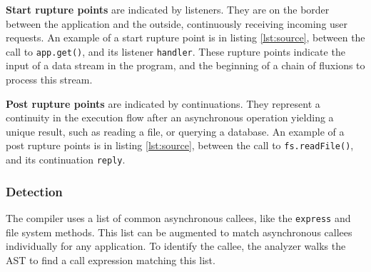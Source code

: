 \textbf{Start rupture points} are indicated by listeners. They are on the border between the application and the outside, continuously receiving incoming user requests.
An example of a start rupture point is in listing \ref{lst:source}, between the call to \texttt{app.get()}, and its listener \texttt{handler}.
These rupture points indicate the input of a data stream in the program, and the beginning of a chain of fluxions to process this stream.

\textbf{Post rupture points} are indicated by continuations.
They represent a continuity in the execution flow after an asynchronous operation yielding a unique result, such as reading a file, or querying a database.
An example of a post rupture points is in listing \ref{lst:source}, between the call to \texttt{fs.readFile()}, and its continuation \texttt{reply}.


\subsubsection{Detection}

The compiler uses a list of common asynchronous callees, like the \texttt{express} and file system methods.
This list can be augmented to match asynchronous callees individually for any application.
To identify the callee, the analyzer walks the AST to find a call expression matching this list.


